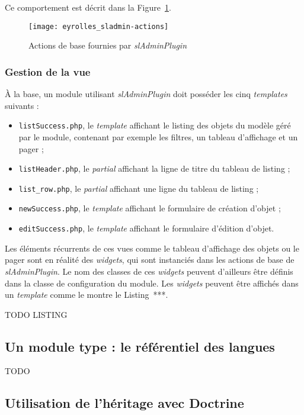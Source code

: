 Ce comportement est décrit dans la Figure~\ref{figure:eyrolles_sladmin-actions}.

\begin{figure}
	\centering
	\texttt{[image: eyrolles\_sladmin-actions]}
	\caption{Actions de base fournies par \textit{slAdminPlugin}}
	\label{figure:eyrolles_sladmin-actions}
\end{figure}

\subsubsection{Gestion de la vue}

À la base, un module utilisant \textit{slAdminPlugin} doit posséder les cinq \textit{templates} suivants :
\begin{itemize}
	\item \texttt{listSuccess.php}, le \textit{template} affichant le listing des objets du modèle géré par le module, contenant par exemple les filtres, un tableau d'affichage et un pager ;
	\item \texttt{listHeader.php}, le \textit{partial} affichant la ligne de titre du tableau de listing ;
	\item \texttt{list_row.php}, le \textit{partial} affichant une ligne du tableau de listing ;
	\item \texttt{newSuccess.php}, le \textit{template} affichant le formulaire de création d'objet ;
	\item \texttt{editSuccess.php}, le \textit{template} affichant le formulaire d'édition d'objet.
\end{itemize}

Les éléments récurrents de ces vues comme le tableau d'affichage des objets ou le pager sont en réalité des \textit{widgets}, qui sont instanciés dans les actions de base de \textit{slAdminPlugin}. Le nom des classes de ces \textit{widgets} peuvent d'ailleurs être définis dans la classe de configuration du module. Les \textit{widgets} peuvent être affichés dans un \textit{template} comme le montre le Listing~***.

TODO LISTING


\subsection{Un module type : le référentiel des langues}
\label{section:eyrolles_ref-langues} 

TODO

\subsection{Utilisation de l'héritage avec Doctrine}

